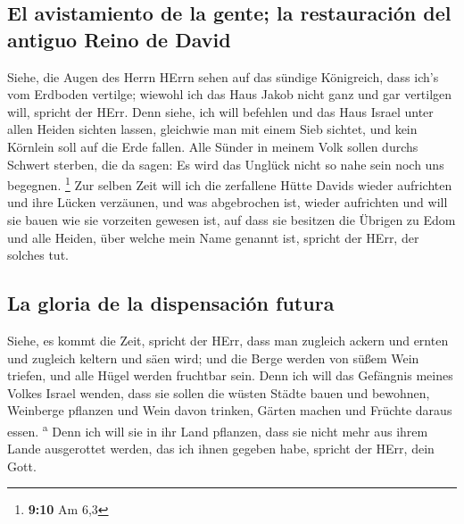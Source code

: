 \hypertarget{el-avistamiento-de-la-gente-la-restauraciuxf3n-del-antiguo-reino-de-david}{%
\subsection{El avistamiento de la gente; la restauración del antiguo
Reino de
David}\label{el-avistamiento-de-la-gente-la-restauraciuxf3n-del-antiguo-reino-de-david}}

 Siehe, die Augen des Herrn HErrn sehen auf das sündige
Königreich, dass ich's vom Erdboden vertilge; wiewohl ich das Haus Jakob
nicht ganz und gar vertilgen will, spricht der HErr.  Denn
siehe, ich will befehlen und das Haus Israel unter allen Heiden sichten
lassen, gleichwie man mit einem Sieb sichtet, und kein Körnlein soll auf
die Erde fallen.  Alle Sünder in meinem Volk sollen
durchs Schwert sterben, die da sagen: Es wird das Unglück nicht so nahe
sein noch uns begegnen. \footnote{\textbf{9:10} Am 6,3} 
Zur selben Zeit will ich die zerfallene Hütte Davids wieder aufrichten
und ihre Lücken verzäunen, und was abgebrochen ist, wieder aufrichten
und will sie bauen wie sie vorzeiten gewesen ist,  auf
dass sie besitzen die Übrigen zu Edom und alle Heiden, über welche mein
Name genannt ist, spricht der HErr, der solches tut.

\hypertarget{la-gloria-de-la-dispensaciuxf3n-futura}{%
\subsection{La gloria de la dispensación
futura}\label{la-gloria-de-la-dispensaciuxf3n-futura}}

 Siehe, es kommt die Zeit, spricht der HErr, dass man
zugleich ackern und ernten und zugleich keltern und säen wird; und die
Berge werden von süßem Wein triefen, und alle Hügel werden fruchtbar
sein.  Denn ich will das Gefängnis meines Volkes Israel
wenden, dass sie sollen die wüsten Städte bauen und bewohnen, Weinberge
pflanzen und Wein davon trinken, Gärten machen und Früchte daraus essen.
\textsuperscript{a}  Denn ich will sie in ihr Land
pflanzen, dass sie nicht mehr aus ihrem Lande ausgerottet werden, das
ich ihnen gegeben habe, spricht der HErr, dein Gott.
